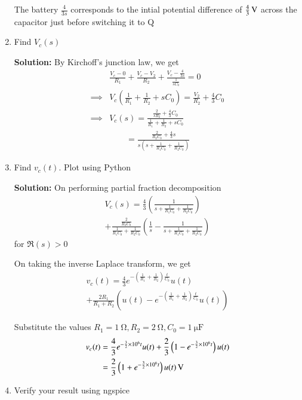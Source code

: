 \documentclass[journal,12pt,twocolumn]{IEEEtran}
\newcommand{\solution}{\noindent \textbf{Solution: }}
\providecommand{\brak}[1]{\ensuremath{\left(#1\right)}}
\numberwithin{equation}{section}
\numberwithin{figure}{section}
\renewcommand\thesection{\arabic{section}}
\begin{document}
\begin{enumerate}[label=\thesection.\arabic*.,ref=\thesection.\theenumi]
	The battery $\frac{4}{3s}$ corresponds to the intial potential difference of $\SI[parse-numbers=false]{\frac43}{\volt}$ across the capacitor just before switching it to Q
	
	\item Find $V_c(s)$
	
	\solution 
	By Kirchoff's junction law, we get
	\begin{align}
		&\frac{V_c - 0}{R_1} + 	\frac{V_c - V_2}{R_2} + \frac{V_c - \frac{4}{3s}}{\frac{1}{sC_0}} = 0 \\
		\implies &V_c \brak{\frac{1}{R_1} + \frac{1}{R_2} + sC_0} =  \frac{V_2}{R_2} + \frac{4}{3}C_0 \\
		\implies &V_c(s) = \frac{\frac{2}{sR_2} + \frac{4}{3}C_0}{\frac{1}{R_1} + \frac{1}{R_2} + sC_0} \\
		&\qquad = \frac{\frac{2}{R_2C_0} + \frac43 s}{s\brak{s + \frac{1}{R_1C_0} + \frac{1}{R_2C_0}}} 
	\end{align}
	
	\item Find $v_c(t)$. Plot using Python
	
	\solution On performing partial fraction decomposition
	\begin{multline}
    V_{c}(s) = \frac{4}{3}\brak{\frac{1}{s + \frac{1}{R_1C_0} + \frac{1}{R_2C_0}}} \\
    + \frac{\frac{2}{R_2C_0}}{\frac{1}{R_1C_0} +\frac{1}{R_2C_0}}\brak{\frac{1}{s} - \frac{1}{s + \frac{1}{R_1C_0} + \frac{1}{R_2C_0}}} 
	\end{multline}
	for $\Re(s) > 0$
	
	On taking the inverse Laplace transform, we get
	\begin{multline}
    v_c(t) = \frac{4}{3}e^{-\brak{\frac{1}{R_1} + \frac{1}{R_2}}\frac{t}{C_0}}u(t) \\
    + \frac{2R_1}{R_1 + R_2} \brak{u(t) - e^{-\brak{\frac{1}{R_1} + \frac{1}{R_2}}\frac{t}{C_0}}u(t) } 
	\end{multline}
	
	Substitute the values $R_1 = \SI{1}{\ohm}, R_2 = \SI{2}{\ohm}, C_0 = \SI{1}{\micro\farad}$
	\begin{align}
		v_c(t) &= \frac43 e^{-\frac{3}{2} \times 10^6 t}u(t) + \frac{2}{3}\brak{1 - e^{-\frac{3}{2} \times 10^6 t}}u(t) \\
		&= \SI[parse-numbers=false]{\frac{2}{3} \brak{1 + e^{-\frac{3}{2} \times 10^6 t}} u(t)}{\volt}
	\end{align}
	
	\item Verify your result using ngspice
	

\end{enumerate}
\end{document}
